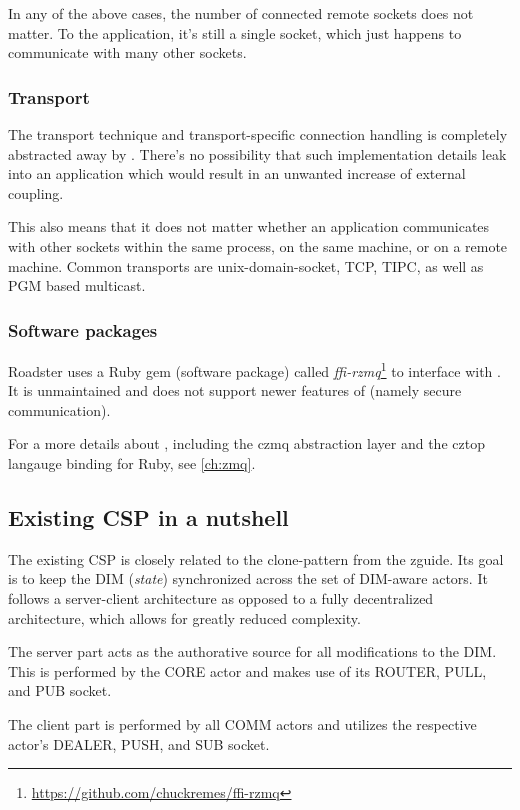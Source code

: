 In any of the above cases, the number of connected remote sockets does not
matter. To the application, it's still a single socket, which just happens to
communicate with many other sockets.

\subsubsection{Transport}
The transport technique and transport-specific connection handling is completely
abstracted away by \zmq. There's no possibility that such implementation
details leak into an application which would result in an unwanted increase of
external coupling.

This also means that it does not matter whether an application communicates with
other \zmq sockets within the same process, on the same machine, or on a remote
machine. Common transports are \gls{unix-domain-socket}, \gls{TCP},
\gls{TIPC}, as well as \gls{PGM} based multicast.

\subsubsection{Software packages}
Roadster uses a Ruby gem (software package) called
\emph{ffi-rzmq}\footnote{\url{https://github.com/chuckremes/ffi-rzmq}} to
interface with \zmq. It is unmaintained and does not support newer features of
\zmq (namely secure communication).


For a more details about \zmq, including the \gls{czmq} abstraction layer and
the \gls{cztop} langauge binding for Ruby, see \autoref{ch:zmq}.


\subsection{Existing CSP in a nutshell}\label{sec:scope:csp}
The existing \acrfull{CSP} is closely related to the \gls{clone-pattern} from
the \gls{zguide}. Its goal is to keep the \gls{DIM} (\emph{state}) synchronized
across the set of DIM-aware actors.  It follows a server-client architecture as
opposed to a fully decentralized architecture, which allows for greatly reduced
complexity.

The server part acts as the authorative source for all modifications to the
DIM. This is performed by the CORE actor and makes use of its ROUTER, PULL, and
PUB socket.

The client part is performed by all COMM actors and utilizes the respective
actor's DEALER, PUSH, and SUB socket.

